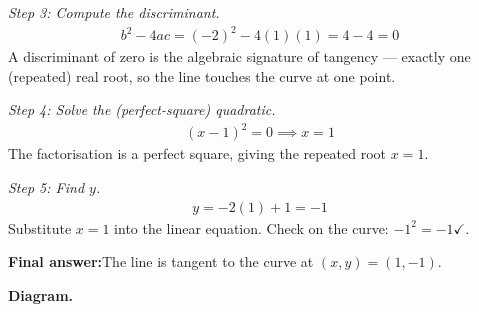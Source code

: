 \documentclass[11pt]{article}
\begin{document}
\textit{Step 3: Compute the discriminant.}
\[\begin{gathered}
b^2 - 4ac = (-2)^2 - 4(1)(1) = 4 - 4 = 0
\end{gathered}\]
A discriminant of zero is the algebraic signature of tangency --- exactly one (repeated) real root, so the line touches the curve at one point.

\textit{Step 4: Solve the (perfect-square) quadratic.}
\[\begin{gathered}
(x - 1)^2 = 0 \implies x = 1
\end{gathered}\]
The factorisation is a perfect square, giving the repeated root \( x = 1 \).

\textit{Step 5: Find \( y \).}
\[\begin{gathered}
y = -2(1) + 1 = -1
\end{gathered}\]
Substitute \( x = 1 \) into the linear equation. Check on the curve: \( -1^2 = -1 \checkmark \).

\begin{answerbox}
\textbf{Final answer:}\quad The line is tangent to the curve at \(\displaystyle (x, y) = (1, -1)\).
\end{answerbox}
\textbf{Diagram.}
\end{document}
